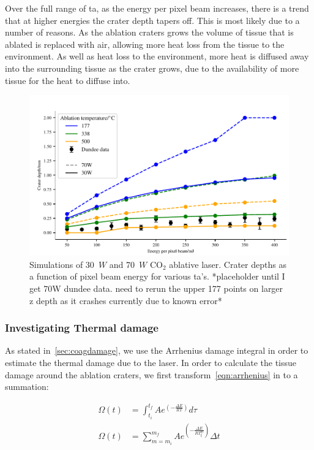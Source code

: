 Over the full range of \gls{ta}, as the energy per pixel beam increases, there is a trend that at higher energies the crater depth tapers off. This is most likely due to a number of reasons. As the ablation craters grows the volume of tissue that is ablated is replaced with air, allowing more heat loss from the tissue to the environment. As well as heat loss to the environment, more heat is diffused away into the surrounding tissue as the crater grows, due to the availability of more tissue for the heat to diffuse into.


\begin{figure}
	\centering
    \includegraphics[width=\columnwidth]{./ablation/images/both.pdf}
    \caption{Simulations of 30~$W$ and 70~$W$ CO$_2$ ablative laser. Crater depths as a function of pixel beam energy for various \gls{ta}'s. *placeholder until I get 70W dundee data. need to rerun the upper 177 points on larger z depth as it crashes currently due to known error*}\label{fig:ta}
\end{figure}
 

\subsubsection{Investigating Thermal damage} 

As stated in~\cref{sec:coagdamage}, we use the Arrhenius damage integral in order to estimate the thermal damage due to the laser. In order to calculate the tissue damage around the ablation craters, we first transform~\cref{eqn:arrhenius} in to a summation:

\begin{align}
\Omega(t) &= \int^{t_{f}}_{t_i} Ae^{(-\tfrac{\Delta E}{RT})}d\tau \\
\Omega(t) &= \sum_{m=m_i}^{m_f} Ae^{(-\tfrac{\Delta E}{RT_{\xi}^{m}})}\Delta t\label{eqn:damagesum}
\end{align}
 
